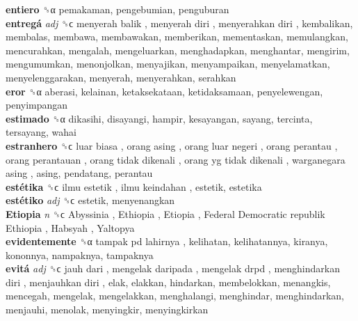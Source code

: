\textbf{entiero} ␝α  pemakaman, pengebumian, penguburan  \\
\textbf{entregá} \emph{adj}  ␝ϲ   menyerah balik ,  menyerah diri ,  menyerahkan diri , kembalikan, membalas, membawa, membawakan, memberikan, mementaskan, memulangkan, mencurahkan, mengalah, mengeluarkan, menghadapkan, menghantar, mengirim, mengumumkan, menonjolkan, menyajikan, menyampaikan, menyelamatkan, menyelenggarakan, menyerah, menyerahkan, serahkan  \\
\textbf{eror} ␝α  aberasi, kelainan, ketaksekataan, ketidaksamaan, penyelewengan, penyimpangan  \\
\textbf{estimado} ␝α  dikasihi, disayangi, hampir, kesayangan, sayang, tercinta, tersayang, wahai  \\
\textbf{estranhero} ␝ϲ   luar biasa ,  orang asing ,  orang luar negeri ,  orang perantau ,  orang perantauan ,  orang tidak dikenali ,  orang yg tidak dikenali ,  warganegara asing , asing, pendatang, perantau  \\
\textbf{estétika} ␝ϲ   ilmu estetik ,  ilmu keindahan , estetik, estetika  \\
\textbf{estétiko} \emph{adj}  ␝ϲ  estetik, menyenangkan  \\
\textbf{Etiopia} \emph{n}  ␝ϲ   Abyssinia ,  Ethiopia ,  Etiopia ,  Federal Democratic republik Ethiopia ,  Habsyah ,  Yaltopya   \\
\textbf{evidentemente} ␝α   tampak pd lahirnya , kelihatan, kelihatannya, kiranya, kononnya, nampaknya, tampaknya  \\
\textbf{evitá} \emph{adj}  ␝ϲ   jauh dari ,  mengelak daripada ,  mengelak drpd ,  menghindarkan diri ,  menjauhkan diri , elak, elakkan, hindarkan, membelokkan, menangkis, mencegah, mengelak, mengelakkan, menghalangi, menghindar, menghindarkan, menjauhi, menolak, menyingkir, menyingkirkan  \\

